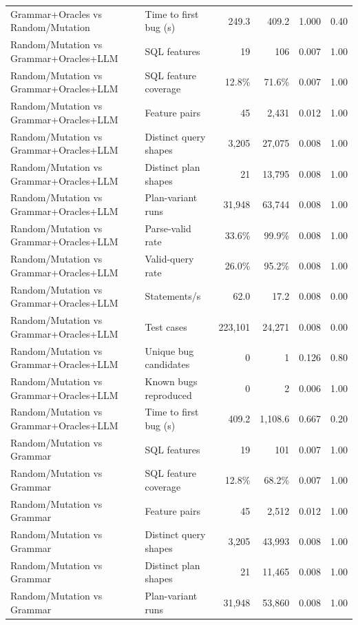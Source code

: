\begin{table}[t]
\begin{tabular}{llrrrr}
    Grammar+Oracles vs Random/Mutation & Time to first bug (s) & 249.3 & 409.2 & 1.000 & 0.40 \\
    Random/Mutation vs Grammar+Oracles+LLM & SQL features & 19 & 106 & 0.007 & 1.00 \\
    Random/Mutation vs Grammar+Oracles+LLM & SQL feature coverage & 12.8\% & 71.6\% & 0.007 & 1.00 \\
    Random/Mutation vs Grammar+Oracles+LLM & Feature pairs & 45 & 2{,}431 & 0.012 & 1.00 \\
    Random/Mutation vs Grammar+Oracles+LLM & Distinct query shapes & 3{,}205 & 27{,}075 & 0.008 & 1.00 \\
    Random/Mutation vs Grammar+Oracles+LLM & Distinct plan shapes & 21 & 13{,}795 & 0.008 & 1.00 \\
    Random/Mutation vs Grammar+Oracles+LLM & Plan-variant runs & 31{,}948 & 63{,}744 & 0.008 & 1.00 \\
    Random/Mutation vs Grammar+Oracles+LLM & Parse-valid rate & 33.6\% & 99.9\% & 0.008 & 1.00 \\
    Random/Mutation vs Grammar+Oracles+LLM & Valid-query rate & 26.0\% & 95.2\% & 0.008 & 1.00 \\
    Random/Mutation vs Grammar+Oracles+LLM & Statements/s & 62.0 & 17.2 & 0.008 & 0.00 \\
    Random/Mutation vs Grammar+Oracles+LLM & Test cases & 223{,}101 & 24{,}271 & 0.008 & 0.00 \\
    Random/Mutation vs Grammar+Oracles+LLM & Unique bug candidates & 0 & 1 & 0.126 & 0.80 \\
    Random/Mutation vs Grammar+Oracles+LLM & Known bugs reproduced & 0 & 2 & 0.006 & 1.00 \\
    Random/Mutation vs Grammar+Oracles+LLM & Time to first bug (s) & 409.2 & 1{,}108.6 & 0.667 & 0.20 \\
    Random/Mutation vs Grammar & SQL features & 19 & 101 & 0.007 & 1.00 \\
    Random/Mutation vs Grammar & SQL feature coverage & 12.8\% & 68.2\% & 0.007 & 1.00 \\
    Random/Mutation vs Grammar & Feature pairs & 45 & 2{,}512 & 0.012 & 1.00 \\
    Random/Mutation vs Grammar & Distinct query shapes & 3{,}205 & 43{,}993 & 0.008 & 1.00 \\
    Random/Mutation vs Grammar & Distinct plan shapes & 21 & 11{,}465 & 0.008 & 1.00 \\
    Random/Mutation vs Grammar & Plan-variant runs & 31{,}948 & 53{,}860 & 0.008 & 1.00 \\

\end{tabular}
\end{table}
